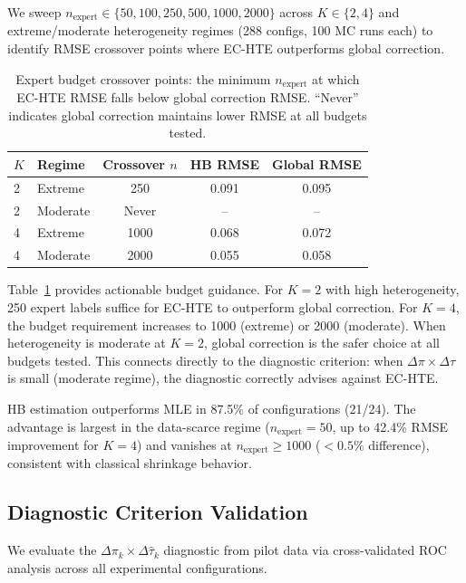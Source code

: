 \documentclass[11pt,twocolumn]{article}
\begin{document}
We sweep $n_{\text{expert}} \in \{50, 100, 250, 500, 1000, 2000\}$ across $K \in \{2, 4\}$ and extreme/moderate heterogeneity regimes (288 configs, 100 MC runs each) to identify RMSE crossover points where EC-HTE outperforms global correction.

\begin{table}[t]
\centering
\caption{Expert budget crossover points: the minimum $n_{\text{expert}}$ at which EC-HTE RMSE falls below global correction RMSE. ``Never'' indicates global correction maintains lower RMSE at all budgets tested.}
\label{tab:budget}
\small
\begin{tabular}{@{}llccc@{}}
\toprule
$K$ & Regime & Crossover $n$ & HB RMSE & Global RMSE \\
\midrule
2 & Extreme & 250 & 0.091 & 0.095 \\
2 & Moderate & Never & -- & -- \\
4 & Extreme & 1000 & 0.068 & 0.072 \\
4 & Moderate & 2000 & 0.055 & 0.058 \\
\bottomrule
\end{tabular}
\end{table}

Table~\ref{tab:budget} provides actionable budget guidance. For $K\!=\!2$ with high heterogeneity, 250 expert labels suffice for EC-HTE to outperform global correction. For $K\!=\!4$, the budget requirement increases to 1000 (extreme) or 2000 (moderate). When heterogeneity is moderate at $K\!=\!2$, global correction is the safer choice at all budgets tested. This connects directly to the diagnostic criterion: when $\Delta\pi \times \Delta\tau$ is small (moderate regime), the diagnostic correctly advises against EC-HTE.

HB estimation outperforms MLE in 87.5\% of configurations (21/24). The advantage is largest in the data-scarce regime ($n_{\text{expert}} = 50$, up to 42.4\% RMSE improvement for $K\!=\!4$) and vanishes at $n_{\text{expert}} \geq 1000$ ($<0.5\%$ difference), consistent with classical shrinkage behavior.

\subsection{Diagnostic Criterion Validation}
\label{sec:diagnostic_exp}

We evaluate the $\Delta\pi_k \times \Delta\hat{\tau}_k$ diagnostic from pilot data via cross-validated ROC analysis across all experimental configurations.
\end{document}
